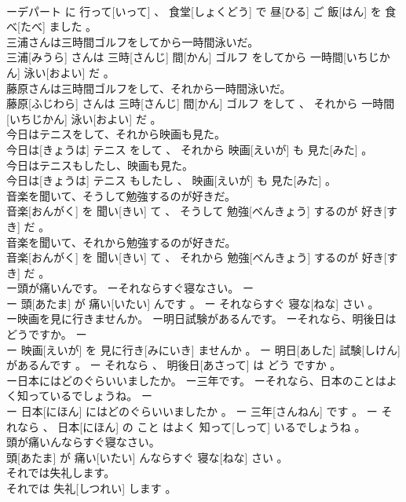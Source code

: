 \documentclass[8pt]{extreport}
\begin{document}
\begin{CJK}{UTF8}{min}
\\	ーデパート に 行って[いって] 、 食堂[しょくどう] で 昼[ひる] ご 飯[はん] を 食べ[たべ] ました 。
\\	三浦さんは三時間ゴルフをしてから一時間泳いだ。	
\\	三浦[みうら] さんは 三時[さんじ] 間[かん] ゴルフ をしてから 一時間[いちじかん] 泳い[およい] だ 。
\\	藤原さんは三時間ゴルフをして、それから一時間泳いだ。	
\\	藤原[ふじわら] さんは 三時[さんじ] 間[かん] ゴルフ をして 、 それから 一時間[いちじかん] 泳い[およい] だ 。
\\	今日はテニスをして、それから映画も見た。	
\\	今日は[きょうは] テニス をして 、 それから 映画[えいが] も 見た[みた] 。
\\	今日はテニスもしたし、映画も見た。	
\\	今日は[きょうは] テニス もしたし 、 映画[えいが] も 見た[みた] 。
\\	音楽を聞いて、そうして勉強するのが好きだ。	
\\	音楽[おんがく] を 聞い[きい] て 、 そうして 勉強[べんきょう] するのが 好き[すき] だ 。
\\	音楽を聞いて、それから勉強するのが好きだ。	
\\	音楽[おんがく] を 聞い[きい] て 、 それから 勉強[べんきょう] するのが 好き[すき] だ 。
\\	ー頭が痛いんです。 ーそれならすぐ寝なさい。	ー
\\	ー 頭[あたま] が 痛い[いたい] んです 。 ー それならすぐ 寝な[ねな] さい 。
\\	ー映画を見に行きませんか。 ー明日試験があるんです。 ーそれなら、明後日はどうですか。	ー
\\	ー 映画[えいが] を 見に行き[みにいき] ませんか 。 ー 明日[あした] 試験[しけん] があるんです 。 ー それなら 、 明後日[あさって] は どう ですか 。
\\	ー日本にはどのぐらいいましたか。 ー三年です。 ーそれなら、日本のことはよく知っているでしょうね。	ー
\\	ー 日本[にほん] にはどのぐらいいましたか 。 ー 三年[さんねん] です 。 ー それなら 、 日本[にほん] の こと はよく 知って[しって] いるでしょうね 。
\\	頭が痛いんならすぐ寝なさい。	
\\	頭[あたま] が 痛い[いたい] んならすぐ 寝な[ねな] さい 。
\\	それでは失礼します。	
\\	それでは 失礼[しつれい] します 。

\end{CJK}
\end{document}
